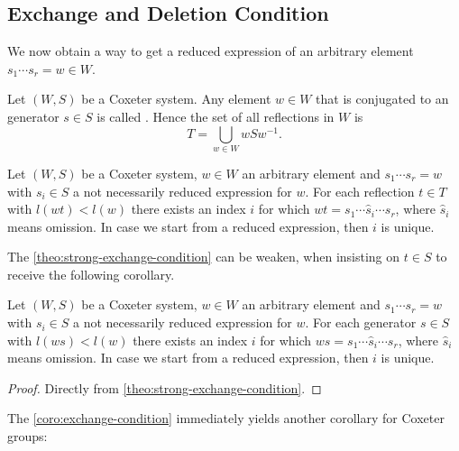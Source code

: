 \subsection{Exchange and Deletion Condition}
\label{sec:coxeter-groups-exchange-deletion-condition}

We now obtain a way to get a reduced expression of an arbitrary element $s_1 \cdots s_r = w \in W$.

\begin{defi}
	Let $(W,S)$ be a Coxeter system. Any element $w \in W$ that is conjugated to an generator $s \in S$ is called . Hence the set of all reflections in $W$ is
	$$ T = \bigcup_{w \in W} wSw^{-1}. $$
\end{defi}

\begin{theo}
	Let $(W,S)$ be a Coxeter system, $w \in W$ an arbitrary element and ${s_1 \cdots s_r = w}$ with $s_i \in S$ a not necessarily reduced expression for $w$. For each reflection $t \in T$ with $l(wt) < l(w)$ there exists an index $i$ for which $wt = s_1 \cdots \hat s_i \cdots s_r$, where $\hat s_i$ means omission. In case we start from a reduced expression, then $i$ is unique.
\end{theo}

The \ref{theo:strong-exchange-condition} can be weaken, when insisting on $t \in S$ to receive the following corollary.

\begin{coro}
	Let $(W,S)$ be a Coxeter system, $w \in W$ an arbitrary element and ${s_1 \cdots s_r = w}$ with $s_i \in S$ a not necessarily reduced expression for $w$. For each generator $s \in S$ with $l(ws) < l(w)$ there exists an index $i$ for which $ws = s_1 \cdots \hat s_i \cdots s_r$, where $\hat s_i$ means omission. In case we start from a reduced expression, then $i$ is unique.

	\begin{proof}
		Directly from \ref{theo:strong-exchange-condition}.
	\end{proof}
\end{coro}

The \ref{coro:exchange-condition} immediately yields another corollary for Coxeter groups:

